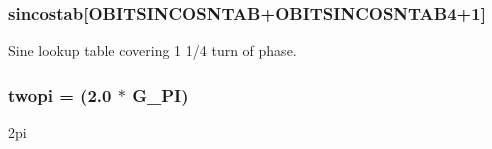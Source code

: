 \subsubsection{ {\bf sincostab}[OBITSINCOSNTAB+OBITSINCOSNTAB4+1]}\label{ObitSinCos_8c_a3}


Sine lookup table covering 1 1/4 turn of phase. 

\subsubsection{ {\bf twopi} = (2.0 $\ast$ G\_\-PI)}\label{ObitSinCos_8c_a6}


2pi 

